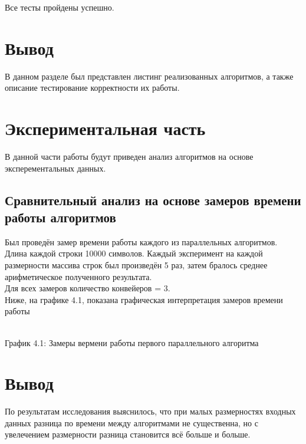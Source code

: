 \documentclass[12pt,a4paper]{article}
\numberwithin{equation}{section}
\begin{document}
Все тесты пройдены успешно.

\section*{Вывод}
\qquad В данном разделе был представлен листинг реализованных алгоритмов, а также описание тестирование корректности их работы.
\clearpage

\section{Экспериментальная часть}
\qquad В данной части работы будут приведен анализ алгоритмов на основе эксперементальных данных.
\subsection{Сравнительный анализ на основе замеров времени работы алгоритмов}
Был проведён замер времени работы каждого из параллельных алгоритмов. Длина каждой строки 10000 символов. Каждый эксперимент на каждой размерности массива строк был произведён 5 раз, затем бралось среднее арифметическое полученного результата.\\
Для всех замеров количество конвейеров = 3.\\

Ниже, на графике 4.1, показана графическая интерпретация замеров времени работы\\

\begin{center}
	\\
	График 4.1: Замеры вермени работы первого параллельного алгоритма\\
\end{center}

\section*{Вывод}
По результатам исследования выяснилось, что при малых размерностях входных данных разница по времени между алгоритмами не существенна, но с увелечением размерности разница становится всё больше и больше.
\clearpage
\end{document}

